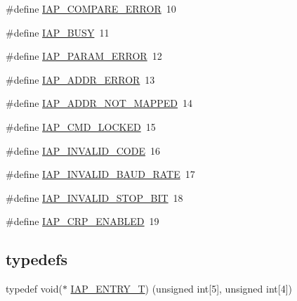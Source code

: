 \begin{DoxyCompactItemize}
\#define \hyperlink{group___i_a_p__18_x_x__43_x_x_gabeb57ce3d4009fdee1847f5494376c8d}{I\+A\+P\+\_\+\+C\+O\+M\+P\+A\+R\+E\+\_\+\+E\+R\+R\+OR}~10
\item 
\#define \hyperlink{group___i_a_p__18_x_x__43_x_x_gaa4e308bc310bb68aa8409a6f830aee04}{I\+A\+P\+\_\+\+B\+U\+SY}~11
\item 
\#define \hyperlink{group___i_a_p__18_x_x__43_x_x_ga6bf1bec9cbb419f8006447171e9750b7}{I\+A\+P\+\_\+\+P\+A\+R\+A\+M\+\_\+\+E\+R\+R\+OR}~12
\item 
\#define \hyperlink{group___i_a_p__18_x_x__43_x_x_gaaff51c256373e4a20f8dab1adc1300f3}{I\+A\+P\+\_\+\+A\+D\+D\+R\+\_\+\+E\+R\+R\+OR}~13
\item 
\#define \hyperlink{group___i_a_p__18_x_x__43_x_x_ga4cfd7e0c133c450664f0a60bfbbd9eaa}{I\+A\+P\+\_\+\+A\+D\+D\+R\+\_\+\+N\+O\+T\+\_\+\+M\+A\+P\+P\+ED}~14
\item 
\#define \hyperlink{group___i_a_p__18_x_x__43_x_x_gafdceac1acd5c460094011136c08574a4}{I\+A\+P\+\_\+\+C\+M\+D\+\_\+\+L\+O\+C\+K\+ED}~15
\item 
\#define \hyperlink{group___i_a_p__18_x_x__43_x_x_ga456a8363a47d21d7198056da4b1e9f61}{I\+A\+P\+\_\+\+I\+N\+V\+A\+L\+I\+D\+\_\+\+C\+O\+DE}~16
\item 
\#define \hyperlink{group___i_a_p__18_x_x__43_x_x_ga6913ca0660dc1a2cccd8c6b09bcdbc75}{I\+A\+P\+\_\+\+I\+N\+V\+A\+L\+I\+D\+\_\+\+B\+A\+U\+D\+\_\+\+R\+A\+TE}~17
\item 
\#define \hyperlink{group___i_a_p__18_x_x__43_x_x_ga6c61111082b04ba6780151c83f8c3644}{I\+A\+P\+\_\+\+I\+N\+V\+A\+L\+I\+D\+\_\+\+S\+T\+O\+P\+\_\+\+B\+IT}~18
\item 
\#define \hyperlink{group___i_a_p__18_x_x__43_x_x_gaaccc191ce402e19b0c0ae399f614efe8}{I\+A\+P\+\_\+\+C\+R\+P\+\_\+\+E\+N\+A\+B\+L\+ED}~19
\end{DoxyCompactItemize}
\subsection*{\textquotesingle{}typedefs\textquotesingle{}}
\begin{DoxyCompactItemize}
\item 
typedef void($\ast$ \hyperlink{group___i_a_p__18_x_x__43_x_x_ga07176e9ce6963e57318fa8c127b4f611}{I\+A\+P\+\_\+\+E\+N\+T\+R\+Y\+\_\+T}) (unsigned int\mbox{[}5\mbox{]}, unsigned int\mbox{[}4\mbox{]})
\end{DoxyCompactItemize}
